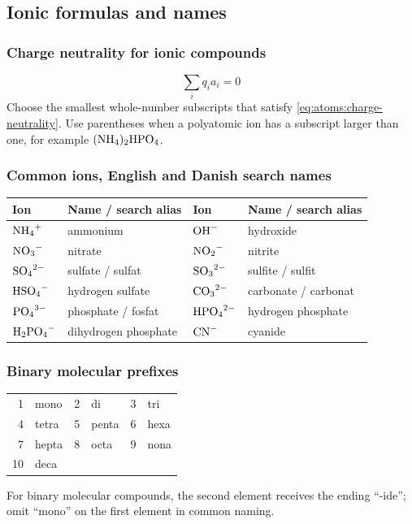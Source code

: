 \subsection{Ionic formulas and names}

\subsubsection{Charge neutrality for ionic compounds}
\begin{equation}\label{eq:atoms:charge-neutrality}
\sum_i q_i a_i=0
\end{equation}
Choose the smallest whole-number subscripts that satisfy \eqref{eq:atoms:charge-neutrality}. Use parentheses when a polyatomic ion has a subscript larger than one, for example \(\ce{(NH4)2HPO4}\).

\subsubsection{Common ions, English and Danish search names}
\begin{tabular}{@{}llll@{}}
\toprule
Ion & Name / search alias & Ion & Name / search alias\\
\midrule
\(\ce{NH4+}\) & ammonium & \(\ce{OH-}\) & hydroxide\\
\(\ce{NO3-}\) & nitrate & \(\ce{NO2-}\) & nitrite\\
\(\ce{SO4^2-}\) & sulfate / sulfat & \(\ce{SO3^2-}\) & sulfite / sulfit\\
\(\ce{HSO4-}\) & hydrogen sulfate & \(\ce{CO3^2-}\) & carbonate / carbonat\\
\(\ce{PO4^3-}\) & phosphate / fosfat & \(\ce{HPO4^2-}\) & hydrogen phosphate\\
\(\ce{H2PO4-}\) & dihydrogen phosphate & \(\ce{CN-}\) & cyanide\\
\bottomrule
\end{tabular}

\subsubsection{Binary molecular prefixes}
\begin{tabular}{@{}r l@{\qquad}r l@{\qquad}r l@{}}
\toprule
1 & mono & 2 & di & 3 & tri\\
4 & tetra & 5 & penta & 6 & hexa\\
7 & hepta & 8 & octa & 9 & nona\\
10 & deca & & & &\\
\bottomrule
\end{tabular}
For binary molecular compounds, the second element receives the ending ``-ide''; omit ``mono'' on the first element in common naming.

